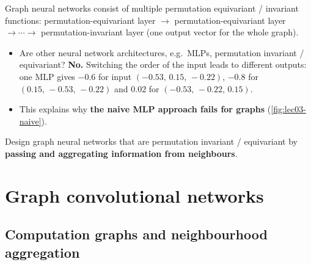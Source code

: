 \begin{keyidea}
  Graph neural networks consist of multiple permutation equivariant /
  invariant functions: permutation-equivariant layer $\to$
  permutation-equivariant layer $\to\cdots\to$ permutation-invariant layer
  (one output vector for the whole graph).
\end{keyidea}
\begin{itemize}
  \item Are other neural network architectures, e.g.\ MLPs, permutation
    invariant / equivariant? \textbf{No.} Switching the order of the input
    leads to different outputs: one MLP gives $-0.6$ for input
    $(-0.53,\,0.15,\,-0.22)$, $-0.8$ for $(0.15,\,-0.53,\,-0.22)$ and $0.02$ for
    $(-0.53,\,-0.22,\,0.15)$.
  \item This explains why \textbf{the naive MLP approach fails for graphs}
    (\cref{fig:lec03-naive}).
\end{itemize}
\begin{keyidea}[Next]
  Design graph neural networks that are permutation invariant / equivariant
  by \textbf{passing and aggregating information from neighbours}.
\end{keyidea}

\section{Graph convolutional networks}\label{sec:lec03-gcn}

\subsection{Computation graphs and neighbourhood aggregation}\label{sec:lec03-compgraph}

